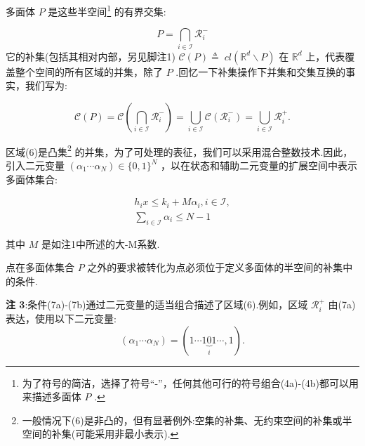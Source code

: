 \documentclass[10pt]{article}
\begin{document}
多面体 \(P\) 是这些半空间\footnote{为了符号的简洁，选择了符号“-”，任何其他可行的符号组合(4a)-(4b)都可以用来描述多面体 \(P\) .} 的有界交集:


\begin{equation}
P = \mathop{\bigcap }\limits_{{i \in  \mathcal{I}}}{\mathcal{R}}_{i}^{ - }
\end{equation}
它的补集(包括其相对内部，另见脚注1) \(\mathcal{C}\left( P\right)  \triangleq \; {cl}\left( {{\mathbb{R}}^{d} \smallsetminus  P}\right)\) 在 \({\mathbb{R}}^{d}\) 上，代表覆盖整个空间的所有区域的并集，除了 \(P\) .回忆一下补集操作下并集和交集互换的事实，我们写为:

\begin{equation}
\mathcal{C}\left( P\right)  = \mathcal{C}\left( {\mathop{\bigcap }\limits_{{i \in  \mathcal{I}}}{\mathcal{R}}_{i}^{ - }}\right)  = \mathop{\bigcup }\limits_{{i \in  \mathcal{I}}}\mathcal{C}\left( {\mathcal{R}}_{i}^{ - }\right)  = \mathop{\bigcup }\limits_{{i \in  \mathcal{I}}}{\mathcal{R}}_{i}^{ + }.
\end{equation}


区域(6)是凸集\footnote{一般情况下(6)是非凸的，但有显著例外:空集的补集、无约束空间的补集或半空间的补集(可能采用非最小表示).} 的并集，为了可处理的表征，我们可以采用混合整数技术.因此，引入二元变量 \(\left( {{\alpha }_{1}\cdots {\alpha }_{N}}\right)  \in  \{ 0,1{\} }^{N}\) ，以在状态和辅助二元变量的扩展空间中表示多面体集合:

\begin{subequations}
\begin{gather}
{h}_{i}x \leq  {k}_{i} + M{\alpha }_{i},i \in  \mathcal{I}, \\
\mathop{\sum }\limits_{{i \in  \mathcal{I}}}{\alpha }_{i} \leq  N - 1
\end{gather}
\end{subequations}

其中 \(M\) 是如注1中所述的大-M系数.

点在多面体集合 \(P\) 之外的要求被转化为点必须位于定义多面体的半空间的补集中的条件.

\vspace{1 em}
\noindent\textbf{注 3}:条件(7a)-(7b)通过二元变量的适当组合描述了区域(6).例如，区域 \({\mathcal{R}}_{i}^{ + }\) 由(7a)表达，使用以下二元变量:
\begin{equation}
\left( {{\alpha }_{1}\cdots {\alpha }_{N}}\right)  = \left( {1\cdots 1\underset{i}{\underbrace{0}}1\cdots ,1}\right) .
\end{equation}
\vspace{1 em}
\end{document}
